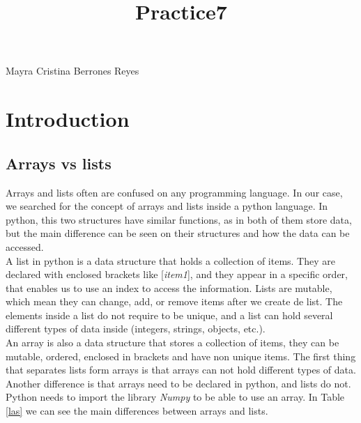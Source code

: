 \documentclass{article}
\begin{document}
\title{Practice7}


\maketitle
Mayra Cristina Berrones Reyes

\section{Introduction}

\subsection{Arrays vs lists}

Arrays and lists often are confused on any programming language. In our case, we searched for the concept of arrays and lists inside a python language. In python, this two structures have similar functions, as in both of them store data, but the main difference can be seen on their structures and how the data can be accessed.\\

A list in python is a data structure that holds a collection of items. They are declared with enclosed brackets like [\textit{item1}], and they appear in a specific order, that enables us to use an index to access the information. Lists are mutable, which mean they can change, add, or remove items after we create de list. The elements inside a list do not require to be unique, and a list can hold several different types of data inside (integers, strings, objects, etc.).\\

An array is also a data structure that stores a collection of items, they can be mutable, ordered, enclosed in brackets and have non unique items. The first thing that separates lists form arrays is that arrays can not hold different types of data.\\

Another difference is that arrays need to be declared in python, and lists do not. Python needs to import the library \textit{Numpy} to be able to use an array. In Table \ref{las} we can see the main differences between arrays and lists.\\
\end{document}
